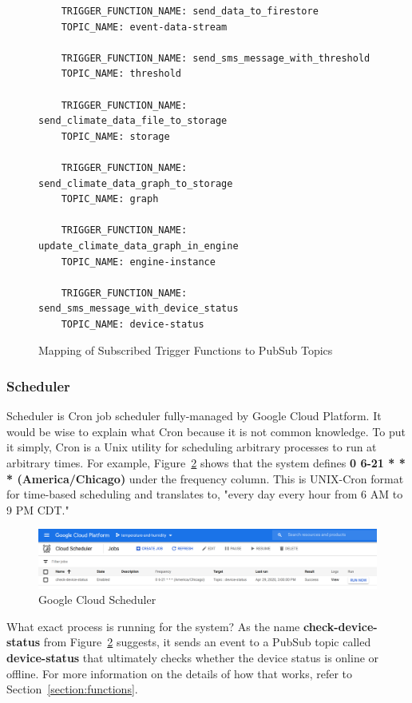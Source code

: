 \documentclass{article}
\begin{document}
\begin{figure}[H]
    \begin{lstlisting}
    TRIGGER_FUNCTION_NAME: send_data_to_firestore
    TOPIC_NAME: event-data-stream

    TRIGGER_FUNCTION_NAME: send_sms_message_with_threshold
    TOPIC_NAME: threshold

    TRIGGER_FUNCTION_NAME: send_climate_data_file_to_storage
    TOPIC_NAME: storage

    TRIGGER_FUNCTION_NAME: send_climate_data_graph_to_storage
    TOPIC_NAME: graph

    TRIGGER_FUNCTION_NAME: update_climate_data_graph_in_engine
    TOPIC_NAME: engine-instance

    TRIGGER_FUNCTION_NAME: send_sms_message_with_device_status
    TOPIC_NAME: device-status
    \end{lstlisting}
    \caption{Mapping of Subscribed Trigger Functions to PubSub Topics}
    \label{fig:mapping}
\end{figure}

\subsubsection{Scheduler}
\label{section:scheduler}
Scheduler is Cron job scheduler fully-managed by Google Cloud Platform. It would be wise to explain what Cron because it is not common knowledge. To put it simply, Cron is a Unix utility for scheduling arbitrary processes to run at arbitrary times. For example, Figure~\ref{fig:scheduler} shows that the system defines \textbf{0 6-21 * * * (America/Chicago)} under the frequency column. This is UNIX-Cron format for time-based scheduling and translates to, "every day every hour from 6 AM to 9 PM CDT."

\begin{figure}[H]
    \center
    \includegraphics[width=\textwidth]{images/scheduler.png}
    \caption{Google Cloud Scheduler}
    \label{fig:scheduler}
\end{figure}

What exact process is running for the system? As the name \textbf{check-device-status} from Figure~\ref{fig:scheduler} suggests, it sends an event to a PubSub topic called \textbf{device-status} that ultimately checks whether the device status is online or offline. For more information on the details of how that works, refer to Section~\ref{section:functions}.
\end{document}
